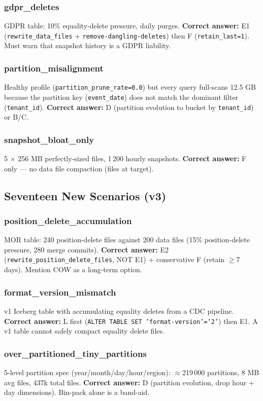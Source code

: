 \documentclass[11pt,a4paper]{article}
\newcommand{\code}[1]{\texttt{#1}}
\begin{document}
\subsubsection{gdpr\_deletes}
GDPR table: 10\% equality-delete pressure, daily purges.
\textbf{Correct answer:} E1 (\code{rewrite\_data\_files} +
\code{remove-dangling-deletes}) then F (\code{retain\_last=1}).
Must warn that snapshot history is a GDPR liability.

\subsubsection{partition\_misalignment}
Healthy profile (\code{partition\_prune\_rate=0.0}) but every query full-scans
12.5 GB because the partition key (\code{event\_date}) does not match the
dominant filter (\code{tenant\_id}).
\textbf{Correct answer:} D (partition evolution to bucket by
\code{tenant\_id}) or B/C.

\subsubsection{snapshot\_bloat\_only}
5 $\times$ 256 MB perfectly-sized files, 1\,200 hourly snapshots.
\textbf{Correct answer:} F only --- no data file compaction (files at target).

\subsection{Seventeen New Scenarios (v3)}

\subsubsection{position\_delete\_accumulation}
MOR table: 240 position-delete files against 200 data files
(15\% position-delete pressure, 280 merge commits).
\textbf{Correct answer:} E2 (\code{rewrite\_position\_delete\_files}, NOT E1)
+ conservative F (retain $\geq$7 days).  Mention COW as a long-term option.

\subsubsection{format\_version\_mismatch}
v1 Iceberg table with accumulating equality deletes from a CDC pipeline.
\textbf{Correct answer:} L first (\code{ALTER TABLE SET 'format-version'='2'})
then E1.  A v1 table cannot safely compact equality delete files.

\subsubsection{over\_partitioned\_tiny\_partitions}
5-level partition spec (year/month/day/hour/region): $\approx$219\,000
partitions, 8 MB avg files, 437k total files.
\textbf{Correct answer:} D (partition evolution, drop hour + day dimensions).
Bin-pack alone is a band-aid.
\end{document}
